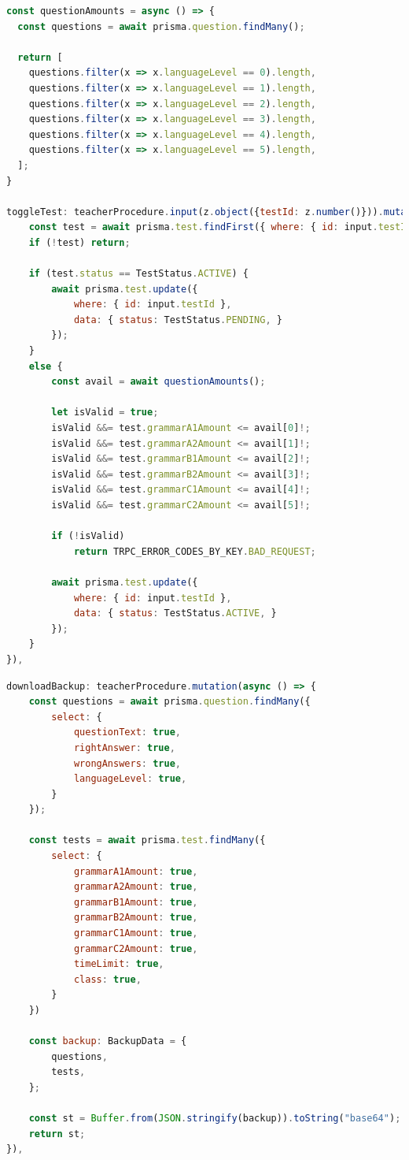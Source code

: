 \pagebreak
\begin{lstlisting}[language=JavaScript,caption={Úryvek \M{/src/server/trpc/router/admin.ts}; endpoint toggleTest a~funkce questionAmounts.}]
const questionAmounts = async () => {
  const questions = await prisma.question.findMany();

  return [
    questions.filter(x => x.languageLevel == 0).length,
    questions.filter(x => x.languageLevel == 1).length,
    questions.filter(x => x.languageLevel == 2).length,
    questions.filter(x => x.languageLevel == 3).length,
    questions.filter(x => x.languageLevel == 4).length,
    questions.filter(x => x.languageLevel == 5).length,
  ];
}

toggleTest: teacherProcedure.input(z.object({testId: z.number()})).mutation(async ({ input }) => {
    const test = await prisma.test.findFirst({ where: { id: input.testId }});
    if (!test) return;

    if (test.status == TestStatus.ACTIVE) {
        await prisma.test.update({
            where: { id: input.testId },
            data: { status: TestStatus.PENDING, }
        });
    } 
    else {
        const avail = await questionAmounts();

        let isValid = true;
        isValid &&= test.grammarA1Amount <= avail[0]!;
        isValid &&= test.grammarA2Amount <= avail[1]!;
        isValid &&= test.grammarB1Amount <= avail[2]!;
        isValid &&= test.grammarB2Amount <= avail[3]!;
        isValid &&= test.grammarC1Amount <= avail[4]!;
        isValid &&= test.grammarC2Amount <= avail[5]!;

        if (!isValid)
            return TRPC_ERROR_CODES_BY_KEY.BAD_REQUEST;

        await prisma.test.update({
            where: { id: input.testId },
            data: { status: TestStatus.ACTIVE, }
        });
    } 
}),
\end{lstlisting}

\newpage


\begin{lstlisting}[language=JavaScript,caption={Úryvek \M{/src/server/trpc/router/admin.ts}; endpoint downloadBackup.}, label=downloadBackup]
downloadBackup: teacherProcedure.mutation(async () => {
    const questions = await prisma.question.findMany({
        select: {
            questionText: true,
            rightAnswer: true,
            wrongAnswers: true,
            languageLevel: true,
        }
    });

    const tests = await prisma.test.findMany({
        select: {
            grammarA1Amount: true,
            grammarA2Amount: true,
            grammarB1Amount: true,
            grammarB2Amount: true,
            grammarC1Amount: true,
            grammarC2Amount: true,
            timeLimit: true,
            class: true,
        }
    })

    const backup: BackupData = {
        questions,
        tests,
    };

    const st = Buffer.from(JSON.stringify(backup)).toString("base64");
    return st;
}),
\end{lstlisting}

